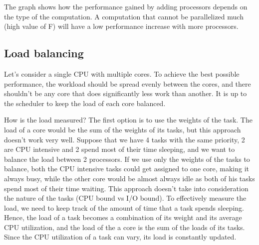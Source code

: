 \label{fig:plot_cpu}

The graph shows how the performance gained by adding processors depends on the type of the computation. A computation that cannot be parallelized much (high value of F) will have a low performance increase with more processors. 

\subsection{Load balancing}

Let's consider a single CPU with multiple cores. To achieve the best possible performance, the workload should be spread evenly between the cores, and there shouldn't be any core that does significantly less work than another. It is up to the scheduler to keep the load of each core balanced.

How is the load measured? The first option is to use the weights of the task. The load of a core would be the sum of the weights of its tasks, but this approach doesn't work very well. Suppose that we have 4 tasks with the same priority, 2 are CPU intensive and 2 spend most of their time sleeping, and we want to balance the load between 2 processors. If we use only the weights of the tasks to balance, both the CPU intensive tasks could get assigned to one core, making it always busy, while the other core would be almost always idle as both of his tasks spend most of their time waiting. This approach doesn't take into consideration the nature of the tasks (CPU bound vs I/O bound). To effectively measure the load, we need to keep track of the amount of time that a task spends sleeping. Hence, the load of a task becomes a combination of its weight and its average CPU utilization, and the load of the a core is the sum of the loads of its tasks. Since the CPU utilization of a task can vary, its load is constantly updated.

